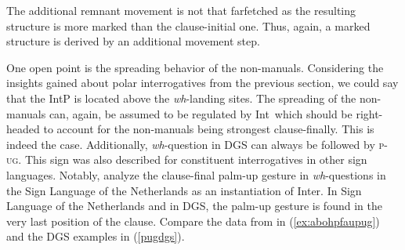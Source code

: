 %
%
%
%


\noindent The additional remnant movement is not that farfetched as the resulting structure is more marked than the clause-initial one. Thus, again, a marked structure is derived by an additional movement step.

One open point is the spreading behavior of the non-manuals. Considering the insights gained about polar interrogatives from the previous section, we could say that the IntP is located above the \textit{wh}-landing sites. The spreading of the non-manuals can, again, be assumed to be regulated by Int\textdegree\ which should be right-headed to account for the non-manuals being strongest clause-finally. This is indeed the case. Additionally, \textit{wh}-question in DGS can always be followed by \textsc{p-ug}. This sign was also described for constituent interrogatives in other sign languages. Notably, \citet{aboh2010sa} analyze the clause-final palm-up gesture in \textit{wh}-questions in the Sign Language of the Netherlands as an instantiation of Inter\textdegree . In Sign Language of the Netherlands and in DGS, the palm-up gesture is found in the very last position of the clause. Compare the data from \citet[111]{aboh2010sa} in (\ref{ex:abohpfaupug}) and the DGS examples in (\ref{pugdgs}).

